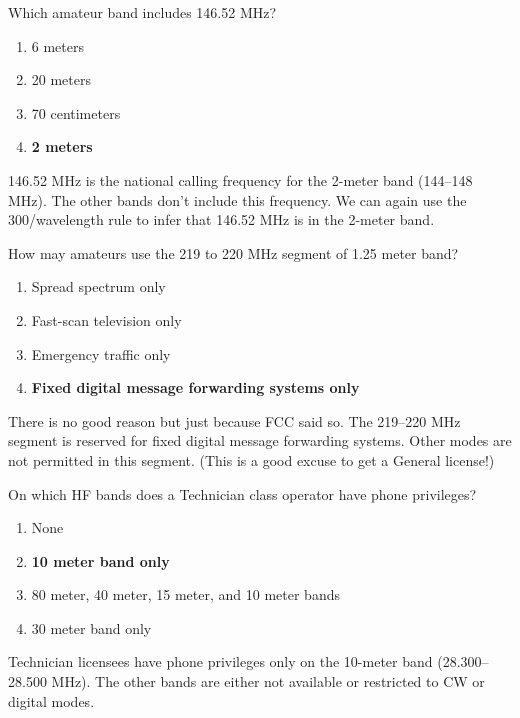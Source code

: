 \begin{tcolorbox}[colback=gray!10!white,colframe=black!75!black,title={T1B04}]
    Which amateur band includes 146.52 MHz?
    \begin{enumerate}[label=\Alph*),noitemsep]
        \item 6 meters
        \item 20 meters
        \item 70 centimeters
        \item \textbf{2 meters}
    \end{enumerate}
\end{tcolorbox}
146.52 MHz is the national calling frequency for the 2-meter band (144–148 MHz). The other bands don’t include this frequency. We can again use the 300/wavelength rule to infer that 146.52 MHz is in the 2-meter band.

\begin{tcolorbox}[colback=gray!10!white,colframe=black!75!black,title={T1B05}]
    How may amateurs use the 219 to 220 MHz segment of 1.25 meter band?
    \begin{enumerate}[label=\Alph*),noitemsep]
        \item Spread spectrum only
        \item Fast-scan television only
        \item Emergency traffic only
        \item \textbf{Fixed digital message forwarding systems only}
    \end{enumerate}
\end{tcolorbox}
There is no good reason but just because FCC said so.
The 219–220 MHz segment is reserved for fixed digital message forwarding systems. Other modes are not permitted in this segment. (This is a good excuse to get a General license!)

\begin{tcolorbox}[colback=gray!10!white,colframe=black!75!black,title={T1B06}]
    On which HF bands does a Technician class operator have phone privileges?
    \begin{enumerate}[label=\Alph*),noitemsep]
        \item None
        \item \textbf{10 meter band only}
        \item 80 meter, 40 meter, 15 meter, and 10 meter bands
        \item 30 meter band only
    \end{enumerate}
\end{tcolorbox}
Technician licensees have phone privileges only on the 10-meter band (28.300–28.500 MHz). The other bands are either not available or restricted to CW or digital modes.

